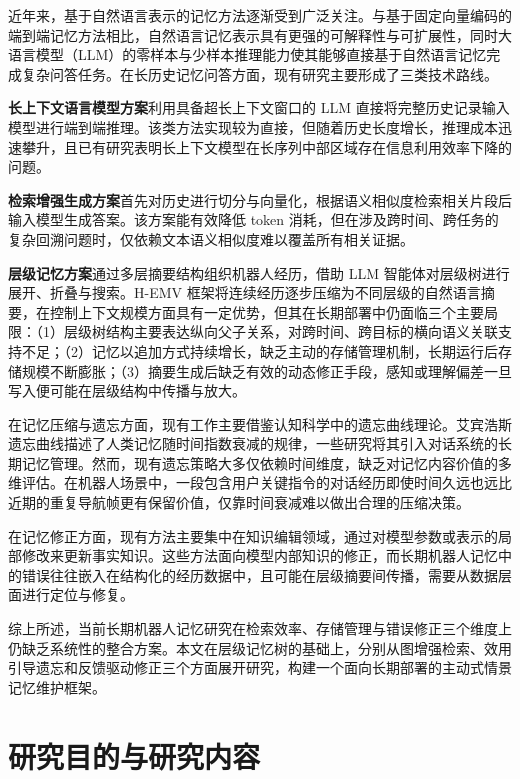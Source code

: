 近年来，基于自然语言表示的记忆方法逐渐受到广泛关注。与基于固定向量编码的端到端记忆方法相比，自然语言记忆表示具有更强的可解释性与可扩展性，同时大语言模型（LLM）的零样本与少样本推理能力使其能够直接基于自然语言记忆完成复杂问答任务。在长历史记忆问答方面，现有研究主要形成了三类技术路线。

\textbf{长上下文语言模型方案}利用具备超长上下文窗口的 LLM 直接将完整历史记录输入模型进行端到端推理\cite{achiam2023gpt4,reid2024gemini}。该类方法实现较为直接，但随着历史长度增长，推理成本迅速攀升，且已有研究表明长上下文模型在长序列中部区域存在信息利用效率下降的问题\cite{liu2024lost}。

\textbf{检索增强生成方案}首先对历史进行切分与向量化，根据语义相似度检索相关片段后输入模型生成答案\cite{lewis2020rag}。该方案能有效降低 token 消耗，但在涉及跨时间、跨任务的复杂回溯问题时，仅依赖文本语义相似度难以覆盖所有相关证据。

\textbf{层级记忆方案}通过多层摘要结构组织机器人经历，借助 LLM 智能体对层级树进行展开、折叠与搜索\cite{liu2024hemv}。H-EMV 框架将连续经历逐步压缩为不同层级的自然语言摘要，在控制上下文规模方面具有一定优势，但其在长期部署中仍面临三个主要局限：（1）层级树结构主要表达纵向父子关系，对跨时间、跨目标的横向语义关联支持不足；（2）记忆以追加方式持续增长，缺乏主动的存储管理机制，长期运行后存储规模不断膨胀；（3）摘要生成后缺乏有效的动态修正手段，感知或理解偏差一旦写入便可能在层级结构中传播与放大。

在记忆压缩与遗忘方面，现有工作主要借鉴认知科学中的遗忘曲线理论。艾宾浩斯遗忘曲线描述了人类记忆随时间指数衰减的规律，一些研究将其引入对话系统的长期记忆管理\cite{packer2023memgpt}。然而，现有遗忘策略大多仅依赖时间维度，缺乏对记忆内容价值的多维评估。在机器人场景中，一段包含用户关键指令的对话经历即使时间久远也远比近期的重复导航帧更有保留价值，仅靠时间衰减难以做出合理的压缩决策。

在记忆修正方面，现有方法主要集中在知识编辑领域，通过对模型参数或表示的局部修改来更新事实知识\cite{meng2022rome,mitchell2022fast}。这些方法面向模型内部知识的修正，而长期机器人记忆中的错误往往嵌入在结构化的经历数据中，且可能在层级摘要间传播，需要从数据层面进行定位与修复。

综上所述，当前长期机器人记忆研究在检索效率、存储管理与错误修正三个维度上仍缺乏系统性的整合方案。本文在层级记忆树的基础上，分别从图增强检索、效用引导遗忘和反馈驱动修正三个方面展开研究，构建一个面向长期部署的主动式情景记忆维护框架。

\section{研究目的与研究内容}


